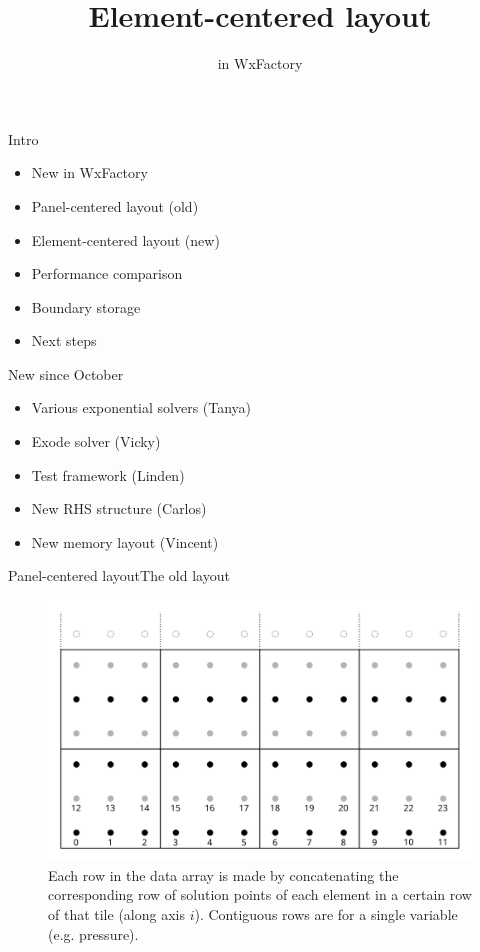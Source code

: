 \documentclass{beamer}
\begin{document}
\title{Element-centered layout}

\subtitle{in WxFactory}
\begin{frame}
    \titlepage
\end{frame}

\begin{frame}{Intro}
\begin{itemize}
    \item New in WxFactory
    \item Panel-centered layout (old)
    \item Element-centered layout (new)
    \item Performance comparison
    \item Boundary storage
    \item Next steps
\end{itemize}
\end{frame}

\begin{frame}{New since October}
\begin{itemize}
    \item Various exponential solvers (Tanya)
    \item Exode solver (Vicky)
    \item Test framework (Linden)
    \item New RHS structure (Carlos)
    \item New memory layout (Vincent)
\end{itemize}
\end{frame}

\begin{frame}{Panel-centered layout}{The old layout}
\begin{figure}
    \includegraphics[scale=0.7]{img/variable_storage}
    \caption{Each row in the data array is made by concatenating the corresponding row of solution points of
             each element in a certain row of that tile (along axis $i$).
             Contiguous rows are for a single variable (e.g. pressure).}
\end{figure}
\end{frame}
\end{document}
